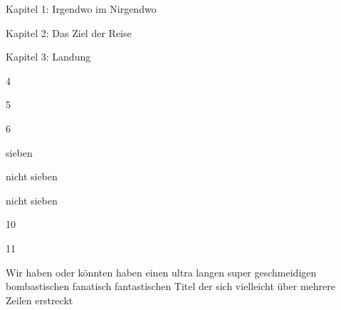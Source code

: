 
{\label{0Kapitel 1: Irgendwo im Nirgendwo}\vspace{0.5cm}\noindent\LARGE Kapitel 1: Irgendwo im Nirgendwo}
\renewcommand{\storychapter}{Kapitel 1: Irgendwo im Nirgendwo}

\vspace{0.5cm}\noindent

{\label{1Kapitel 2: Das Ziel der Reise}\vspace{0.5cm}\noindent\LARGE Kapitel 2: Das Ziel der Reise}
\renewcommand{\storychapter}{Kapitel 2: Das Ziel der Reise}

\vspace{0.5cm}\noindent

{\label{2Kapitel 3: Landung}\vspace{0.5cm}\noindent\LARGE Kapitel 3: Landung}
\renewcommand{\storychapter}{Kapitel 3: Landung}

\vspace{0.5cm}\noindent

{\label{34}\vspace{0.5cm}\noindent\LARGE 4}
\renewcommand{\storychapter}{4}


{\label{45}\vspace{0.5cm}\noindent\LARGE 5}
\renewcommand{\storychapter}{5}


{\label{56}\vspace{0.5cm}\noindent\LARGE 6}
\renewcommand{\storychapter}{6}


{\label{6sieben}\vspace{0.5cm}\noindent\LARGE sieben}
\renewcommand{\storychapter}{sieben}


{\label{7nicht sieben}\vspace{0.5cm}\noindent\LARGE nicht sieben}
\renewcommand{\storychapter}{nicht sieben}


{\label{8nicht sieben}\vspace{0.5cm}\noindent\LARGE nicht sieben}
\renewcommand{\storychapter}{nicht sieben}


{\label{910}\vspace{0.5cm}\noindent\LARGE 10}
\renewcommand{\storychapter}{10}


{\label{1011}\vspace{0.5cm}\noindent\LARGE 11}
\renewcommand{\storychapter}{11}


{\label{11Wir haben oder könnten haben einen ultra langen super geschmeidigen bombastischen fanatisch fantastischen Titel der sich vielleicht über mehrere Zeilen erstreckt}\vspace{0.5cm}\noindent\LARGE Wir haben oder könnten haben einen ultra langen super geschmeidigen bombastischen fanatisch fantastischen Titel der sich vielleicht über mehrere Zeilen erstreckt}
\renewcommand{\storychapter}{Wir haben oder könnten haben einen ultra langen super geschmeidigen bombastischen fanatisch fantastischen Titel der sich vielleicht über mehrere Zeilen erstreckt}


